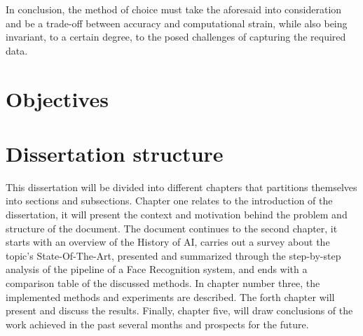 \documentclass[class=report, crop=false, a4paper, 12pt]{standalone}
\begin{document}
\par In conclusion, the method of choice must take the aforesaid into consideration and be a trade-off between accuracy and computational strain, while also being invariant, to a certain degree, to the posed challenges of capturing the required data. 

\section{Objectives}

\section{Dissertation structure}
\par This dissertation will be divided into different chapters that partitions themselves into sections and subsections. Chapter one relates to the introduction of the dissertation, it will present the context and motivation behind the problem and structure of the document. The document continues to the second chapter, it starts with an overview of the History of AI, carries out a survey about the topic's State-Of-The-Art, presented and summarized through the step-by-step analysis of the pipeline of a Face Recognition system, and ends with a comparison table of the discussed methods. In chapter number three, the implemented methods and experiments are described. The forth chapter will present and discuss the results. Finally, chapter five, will draw conclusions of the work achieved in the past several months and prospects for the future.
\end{document}

